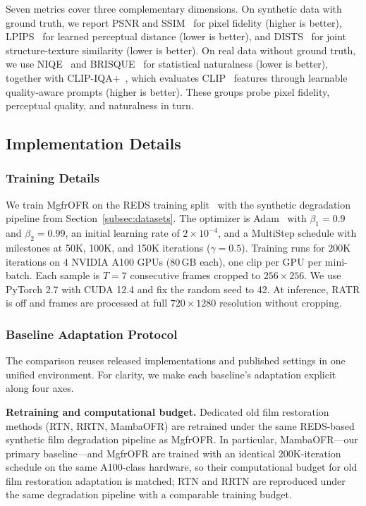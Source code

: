 Seven metrics cover three complementary dimensions. On synthetic data with ground truth, we report PSNR and SSIM~\cite{wang2004ssim} for pixel fidelity (higher is better), LPIPS~\cite{zhang2018lpips} for learned perceptual distance (lower is better), and DISTS~\cite{ding2020dists} for joint structure-texture similarity (lower is better). On real data without ground truth, we use NIQE~\cite{mittal2012niqe} and BRISQUE~\cite{mittal2012brisque} for statistical naturalness (lower is better), together with CLIP-IQA+~\cite{wang2023clipiqa}, which evaluates CLIP~\cite{radford2021clip} features through learnable quality-aware prompts (higher is better). These groups probe pixel fidelity, perceptual quality, and naturalness in turn.

\subsection{Implementation Details}
\label{subsec:implementation}

\subsubsection{Training Details}
\label{subsubsec:training_details}

We train MgfrOFR on the REDS training split~\cite{nah2019reds} with the synthetic degradation pipeline from Section~\ref{subsec:datasets}. The optimizer is Adam~\cite{kingma2015adam} with $\beta_1=0.9$ and $\beta_2=0.99$, an initial learning rate of $2\times10^{-4}$, and a MultiStep schedule with milestones at 50K, 100K, and 150K iterations ($\gamma=0.5$). Training runs for $200$K iterations on $4$ NVIDIA A100 GPUs (80\,GB each), one clip per GPU per mini-batch. Each sample is $T=7$ consecutive frames cropped to $256\times256$. We use PyTorch 2.7 with CUDA 12.4 and fix the random seed to 42. At inference, RATR is off and frames are processed at full $720 \times 1280$ resolution without cropping.

\subsubsection{Baseline Adaptation Protocol}
\label{subsubsec:baseline_adaptation}

The comparison reuses released implementations and published settings in one unified environment. For clarity, we make each baseline's adaptation explicit along four axes.

\textbf{Retraining and computational budget.} Dedicated old film restoration methods (RTN, RRTN, MambaOFR) are retrained under the same REDS-based synthetic film degradation pipeline as MgfrOFR. In particular, MambaOFR---our primary baseline---and MgfrOFR are trained with an identical 200K-iteration schedule on the same A100-class hardware, so their computational budget for old film restoration adaptation is matched; RTN and RRTN are reproduced under the same degradation pipeline with a comparable training budget.

